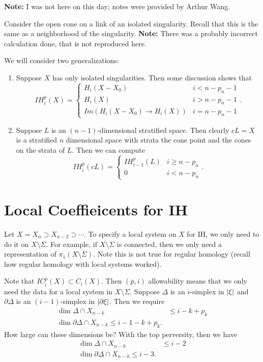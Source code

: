 \documentclass[leqno, openany]{memoir}
\theoremstyle{definition}
\theoremstyle{remark}
\theoremstyle{plain}
\theoremstyle{definition}
\theoremstyle{remark}
\begin{document}
\textbf{Note:} I was not here on this day; notes were provided by Arthur Wang.

Consider the open cone on a link of an isolated singularity. Recall that this
is the same as a neighborhood of the singularity. \textbf{Note:} There was a
probably incorrect calculation done, that is not reproduced here.

We will consider two generalizations: \begin{enumerate} \item Suppose $X$ has
    only isolated singularities. Then some discussion shows that \[
        IH_i^{\overline{p}}(X) = \begin{cases} H_i(X - X_0) & i < n - p_n - 1
            \\ H_i(X) & i > n - p_n - 1 \\ Im(H_i(X-X_0) \to H_i(X)) & i = n -
        p_n - 1 \end{cases}. \] \item Suppose $L$ is an $(n-1)$-dimensional
        stratified space. Then clearly $cL = X$ is a stratified $n$ dimensional
        space with strata the cone point and the cones on the strata of $L$.
        Then we can compute \[ IH_i^{\overline{p}}(cL) = \begin{cases}
    IH_{i-1}^{\overline{p}}(L) & i \geq n - p_n \\ 0 & i < n - p_n \end{cases}.
    \] \end{enumerate}

\section{Local Coeffieicents for IH}%

Let $X = X_n \supset X_{n-2} \supset \cdots$. To specify a local system on $X$
for IH, we only need to do it on $X \setminus \Sigma$. For example, if $X
\setminus \Sigma$ is connected, then we only need a representation of $\pi_1(X
\setminus \Sigma)$. Note this is not true for regular homology (recall how
regular homology with local systems worked).

Note that $IC_i^{\overline{p}}(X) \subset C_i(X)$. Then $(\overline{p}, i)$
allowability means that we only need the data for a local system in $X
\setminus \Sigma$. Suppose $\Delta$ is an $i$-simplex in $\abs{\xi}$ and
$\partial \Delta$ is an $(i-1)$-simplex in $\abs{\partial \xi}$. Then we
require \begin{align*} \dim \Delta \cap X_{n-k} & \leq i - k + p_k \\ \dim
    \partial \Delta \cap X_{n-k} \leq i - 1 - k + p_k.  \end{align*} How large
    can these dimensions be? With the top perversity, then we have
    \begin{align*} \dim \Delta \cap X_{n-k} & \leq i - 2 \\ \dim \partial
    \Delta \cap X_{n-k} \leq i - 3.  \end{align*}
\end{document}

